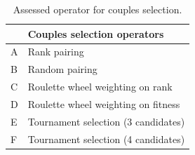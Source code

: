 \documentclass{ametsoc}
\begin{document}
%

\begin{table}[t]
	\caption{Assessed operator for couples selection.}
	\begin{center}
		\begin{tabular}{ll}
			\hline\hline  & \textbf{Couples selection operators} \\ 
			\hline 
			A & Rank pairing \\ 
			B & Random pairing \\ 
			C & Roulette wheel weighting on rank \\ 
			D & Roulette wheel weighting on fitness \\ 
			E & Tournament selection (3 candidates) \\ 
			F & Tournament selection (4 candidates) \\ 
			\hline 
		\end{tabular}
	\end{center}
	\label{tab:assessed_couples_selection_operators}
\end{table}
\end{document}
